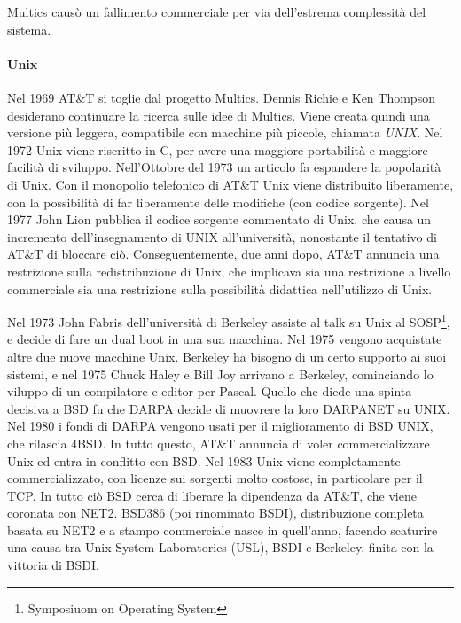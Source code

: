 Multics caus\`o un fallimento commerciale per via dell'estrema complessit\`a del sistema.

\paragraph*{Unix} Nel 1969 AT\&T si toglie dal progetto Multics. Dennis Richie e Ken Thompson desiderano continuare la ricerca sulle idee di Multics. Viene creata quindi una versione pi\`u leggera, compatibile con macchine pi\`u piccole, chiamata \textit{UNIX}. Nel 1972 Unix viene riscritto in C, per avere una maggiore portabilit\`a e maggiore facilit\`a di sviluppo. Nell'Ottobre del 1973 un articolo fa espandere la popolarit\`a di Unix.
Con il monopolio telefonico di AT\&T Unix viene distribuito liberamente, con la possibilit\`a di far liberamente delle modifiche (con codice sorgente). Nel 1977 John Lion pubblica il codice sorgente commentato di Unix, che causa un incremento dell'insegnamento di UNIX all'universit\`a, nonostante il tentativo di AT\&T di bloccare ci\`o. Conseguentemente, due anni dopo, AT\&T annuncia una restrizione sulla redistribuzione di Unix, che implicava sia una restrizione a livello commerciale sia una restrizione sulla possibilit\`a didattica nell'utilizzo di Unix.

Nel 1973 John Fabris dell'universit\`a di Berkeley assiste al talk su Unix al SOSP\footnote{Symposiuom on Operating System}, e decide di fare un dual boot in una sua macchina. Nel 1975 vengono acquistate altre due nuove macchine Unix. Berkeley ha bisogno di un certo supporto ai suoi sistemi, e nel 1975 Chuck Haley e Bill Joy arrivano a Berkeley, cominciando lo viluppo di un compilatore e editor per Pascal. Quello che diede una spinta decisiva a BSD fu che DARPA decide di muovrere la loro DARPANET su UNIX. Nel 1980 i fondi di DARPA vengono usati per il miglioramento di BSD UNIX, che rilascia 4BSD. In tutto questo, AT\&T annuncia di voler commercializzare Unix ed entra in conflitto con BSD. Nel 1983 Unix viene completamente commercializzato, con licenze sui sorgenti molto costose, in particolare per il TCP. In tutto ci\`o BSD cerca di liberare la dipendenza da AT\&T, che viene coronata con NET2. BSD386 (poi rinominato BSDI), distribuzione completa basata su NET2 e a stampo commerciale nasce in quell'anno, facendo scaturire una causa tra Unix System Laboratories (USL), BSDI e Berkeley, finita con la vittoria di BSDI.
